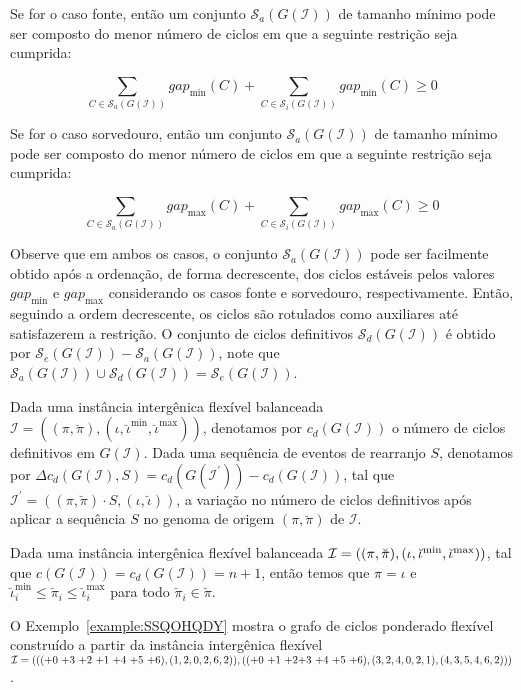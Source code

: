 Se for o caso fonte, então um conjunto $\mathcal{S}_a(G(\mathcal{I}))$ de tamanho mínimo pode ser composto do menor número de ciclos em que a seguinte restrição seja cumprida:

$$\sum_{C \in \mathcal{S}_a(G(\mathcal{I}))} gap_{\min}(C) + \sum_{C \in \mathcal{S}_i(G(\mathcal{I}))} gap_{\min}(C) \ge 0$$

Se for o caso sorvedouro, então um conjunto $\mathcal{S}_a(G(\mathcal{I}))$ de tamanho mínimo pode ser composto do menor número de ciclos em que a seguinte restrição seja cumprida:

$$\sum_{C \in \mathcal{S}_a(G(\mathcal{I}))} gap_{\max}(C) + \sum_{C \in \mathcal{S}_i(G(\mathcal{I}))} gap_{\max}(C) \ge 0$$

Observe que em ambos os casos, o conjunto $\mathcal{S}_a(G(\mathcal{I}))$ pode ser facilmente obtido após a ordenação, de forma decrescente, dos ciclos estáveis pelos valores $gap_{\min}$ e $gap_{\max}$ considerando os casos fonte e sorvedouro, respectivamente. Então, seguindo a ordem decrescente, os ciclos são rotulados como auxiliares até satisfazerem a restrição. O conjunto de ciclos definitivos $\mathcal{S}_d(G(\mathcal{I}))$ é obtido por $\mathcal{S}_e(G(\mathcal{I})) - \mathcal{S}_a(G(\mathcal{I}))$, note que $\mathcal{S}_a(G(\mathcal{I})) \cup \mathcal{S}_d(G(\mathcal{I})) = \mathcal{S}_e(G(\mathcal{I}))$.

Dada uma instância intergênica flexível balanceada $\mathcal{I} = ((\pi,\breve\pi),(\iota,\breve\iota^{\min},\breve\iota^{\max}))$, denotamos por $c_d(G(\mathcal{I}))$ o número de ciclos definitivos em $G(\mathcal{I})$. Dada uma sequência de eventos de rearranjo $S$, denotamos por $\Delta c_d(G(\mathcal{I}), S) = c_d(G(\mathcal{I^{\prime}})) - c_d(G(\mathcal{I}))$, tal que $\mathcal{I^{\prime}} = ((\pi,\breve\pi) \cdot S,(\iota,\breve\iota))$, a variação no número de ciclos definitivos após aplicar a sequência $S$ no genoma de origem $(\pi,\breve\pi)$ de $\mathcal{I}$.

\begin{remark}\label{remark:HLVDQLCE}
Dada uma instância intergênica flexível balanceada $\mathcal{I} = ((\pi,\breve\pi),(\iota,\breve\iota^{\min},\break\breve\iota^{\max}))$, tal que $c(G(\mathcal{I})) = c_d(G(\mathcal{I})) = n+1$, então temos que $\pi = \iota$ e $\breve\iota^{\min}_i \le \breve\pi_i \le \breve\iota^{\max}_i$ para todo $\breve\pi_i \in \breve\pi$.
\end{remark}

O Exemplo~\ref{example:SSQOHQDY} mostra o grafo de ciclos ponderado flexível construído a partir da instância intergênica flexível $\mathcal{I} = ((({+0}~{+3}~{+2}~{+1}~{+4}~{+5}~{+6}),(1,2,0,2,6,2)),(({+0}~{+1}~{+2}\break{+3}~{+4}~{+5}~{+6}),(3,2,4,0,2,1),(4,3,5,4,6,2)))$.

